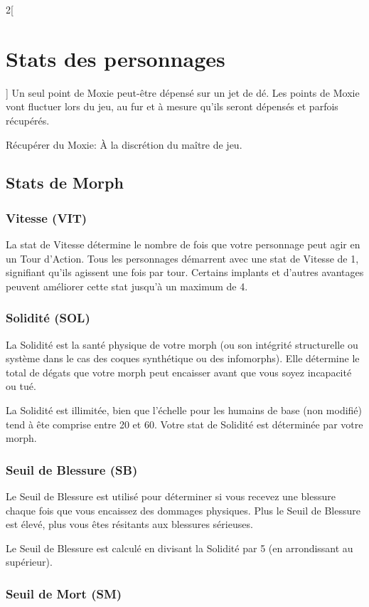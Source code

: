 \documentclass[a4paper,9pt]{article}
\begin{document}
\begin{multicols}{2}[\section{Stats des personnages} \label{sec:character-stats}]
Un seul point de Moxie peut-être dépensé sur un jet de dé. Les points de Moxie
vont fluctuer lors du jeu, au fur et à mesure qu'ils seront dépensés et parfois
récupérés. 

Récupérer du Moxie: À la discrétion du maître de jeu. 

\subsection{Stats de Morph}

\subsubsection{Vitesse (VIT)} \label{sec:speed-spd} 

La stat de Vitesse détermine le nombre de fois que votre personnage peut agir
en un Tour d'Action. Tous les personnages démarrent avec une stat de Vitesse de
1, signifiant qu'ils agissent une fois par tour.  Certains implants et d'autres
avantages peuvent améliorer cette stat jusqu'à un maximum de 4. 

\subsubsection{Solidité (SOL)} \label{sec:durability-dur} 

La Solidité est la santé physique de votre morph (ou son intégrité structurelle
ou système dans le cas des coques synthétique ou des infomorphs). Elle
détermine le total de dégats que votre morph peut encaisser avant que vous
soyez incapacité ou tué.

La Solidité est illimitée, bien que l'échelle pour les humains de base (non
modifié) tend à ête comprise entre 20 et 60. Votre stat de Solidité est
déterminée par votre morph. 

\subsubsection{Seuil de Blessure (SB)} \label{sec:wound-threshold-wt} 

Le Seuil de Blessure est utilisé pour déterminer si vous recevez une blessure
chaque fois que vous encaissez des dommages physiques. Plus le Seuil de
Blessure est élevé, plus vous êtes résitants aux blessures sérieuses. 

Le Seuil de Blessure est calculé en divisant la Solidité par 5 (en arrondissant
au supérieur). 

\subsubsection{Seuil de Mort (SM)} \label{sec:death-rating-dr} 


\end{multicols}
\end{document}
